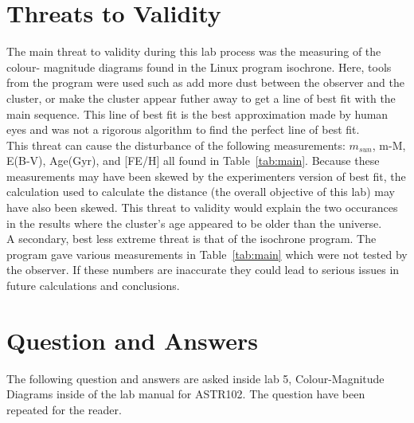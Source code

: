 \documentclass{article}
\begin{document}
\section{Threats to Validity}

The main threat to validity during this lab process was the measuring of the colour-
magnitude diagrams found in the Linux program isochrone. Here, tools from the program
were used such as add more dust between the observer and the cluster, or make the cluster
appear futher away to get a line of best fit with the main sequence. This line of best 
fit is the best approximation made by human eyes and was not a rigorous algorithm to
find the perfect line of best fit.\\

This threat can cause the disturbance of the following measurements: $m_{sun}$, m-M,
E(B-V), Age(Gyr), and [FE/H] all found in Table~\ref{tab:main}. Because these measurements
may have been skewed by the experimenters version of best fit, the calculation used
to calculate the distance (the overall objective of this lab) may have also been skewed.
This threat to validity would explain the two occurances in the results where the cluster's
age appeared to be older than the universe.\\

A secondary, best less extreme threat is that of the isochrone program. The program
gave various measurements in Table~\ref{tab:main} which were not tested by the observer.
If these numbers are inaccurate they could lead to serious issues in future calculations
and conclusions.


\section{Question and Answers}
\label{sec:qna}

The following question and answers are asked inside lab 5, Colour-Magnitude Diagrams
inside of the lab manual for ASTR102. The question have been repeated for the reader.
\end{document}
